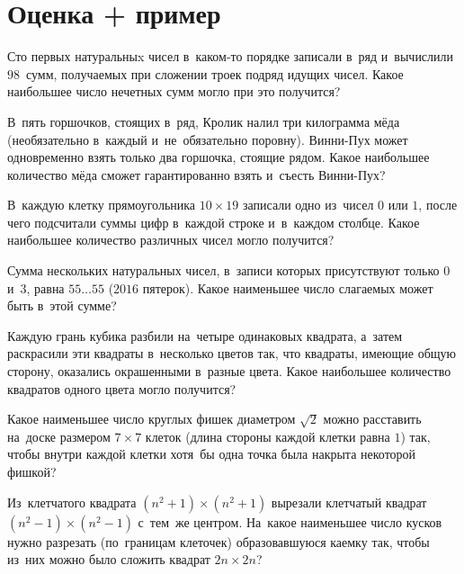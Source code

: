 
\section*{Оценка + пример}


\begin{problems}

\item
Сто первых натуральныx чисел в~каком-то порядке записали в~ряд и~вычислили
$98$~сумм, получаемых при сложении троек подряд идущих чисел.
Какое наибольшее число нечетных сумм могло при это получится?

\item
В~пять горшочков, стоящих в~ряд, Кролик налил три килограмма мёда
(необязательно в~каждый и~не~обязательно поровну).
Винни-Пух может одновременно взять только два горшочка, стоящие рядом.
Какое наибольшее количество мёда сможет гарантированно взять и~съесть
Винни-Пух?

\item
В~каждую клетку прямоугольника $10 \times 19$ записали одно из~чисел
$0$ или $1$, после чего подсчитали суммы цифр в~каждой строке и~в~каждом
столбце.
Какое наибольшее количество различных чисел могло получится?

\item
Сумма нескольких натуральных чисел, в~записи которых присутствуют только $0$
и~$3$, равна $55\ldots55$ ($2016$ пятерок).
Какое наименьшее число слагаемых может быть в~этой сумме?

\item
Каждую грань кубика разбили на~четыре одинаковых квадрата, а~затем раскрасили
эти квадраты в~несколько цветов так, что квадраты, имеющие общую сторону,
оказались окрашенными в~разные цвета.
Какое наибольшее количество квадратов одного цвета могло получится?

\item
Какое наименьшее число круглых фишек диаметром $\sqrt{2}$ можно расставить
на~доске размером $7 \times 7$ клеток (длина стороны каждой клетки равна $1$)
так, чтобы внутри каждой клетки хотя~бы одна точка была накрыта некоторой
фишкой?

\item
Из~клетчатого квадрата $(n^2 + 1) \times (n^2 + 1)$ вырезали клетчатый квадрат
$(n^2 - 1) \times (n^2 - 1)$ с~тем~же центром.
На~какое наименьшее число кусков нужно разрезать (по~границам клеточек)
образовавшуюся каемку так, чтобы из~них можно было сложить квадрат
$2n \times 2n$?

\end{problems}

